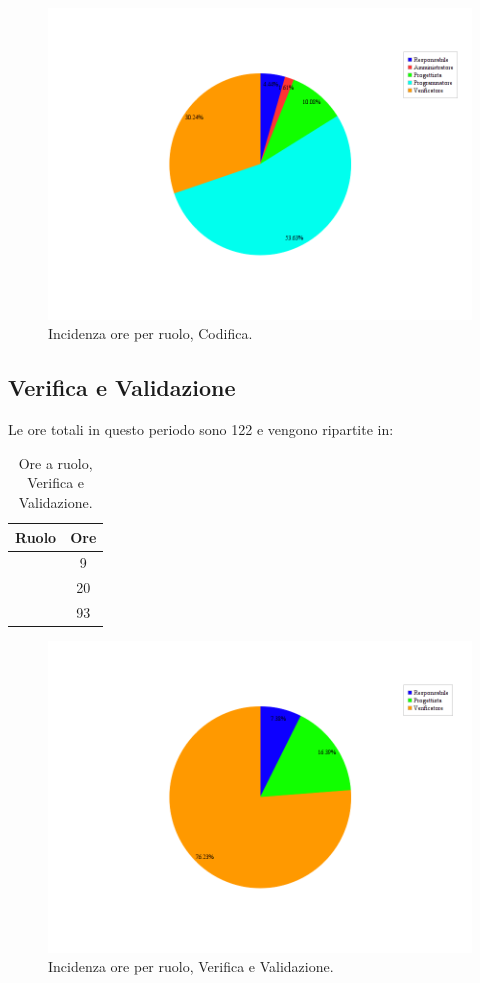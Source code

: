 \begin{figure}[H]
	\centering
	\includegraphics[scale=0.5]{immagini/Grafi/OreRuoloCod}
	\caption{Incidenza ore per ruolo, Codifica.}
\end{figure}

\subsection{Verifica e Validazione}
Le ore totali in questo periodo sono 122 e vengono ripartite in:
\begin{table}[H]
	\begin{center}
		\begin{tabular}{|c|c|}
			\hline
			\textbf{Ruolo}	& \textbf{Ore} \\
			\hline
			\Res	&	9	\\
			\hline
			\Prog		&	20	\\
			\hline
			\Ver	&	93	\\
			\hline
		\end{tabular}
	\end{center}
	\caption{Ore a ruolo, Verifica e Validazione.}
\end{table}

\begin{figure}[H]
	\centering
	\includegraphics[scale=0.5]{immagini/Grafi/OreRuoloVerifica}
	\caption{Incidenza ore per ruolo, Verifica e Validazione.}
\end{figure}

